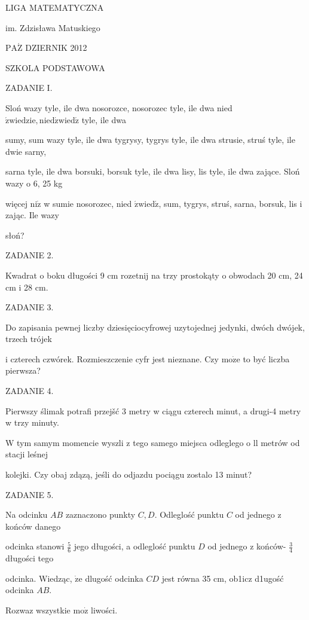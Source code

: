 \documentclass[a4paper,12pt]{article}
\begin{document}
LIGA MATEMATYCZNA

im. Zdzisława Matuskiego

$\mathrm{P}\mathrm{A}\acute{\mathrm{Z}}$ DZIERNIK 2012

SZKOLA PODSTAWOWA

ZADANIE I.

Sloń wazy tyle, ile dwa nosorozce, nosorozec tyle, ile dwa nied $\acute{\mathrm{z}}\mathrm{w}\mathrm{i}\mathrm{e}\mathrm{d}\mathrm{z}\mathrm{i}\mathrm{e}, \mathrm{n}\mathrm{i}\mathrm{e}\mathrm{d}\acute{\mathrm{z}}\mathrm{w}\mathrm{i}\mathrm{e}\mathrm{d}\acute{\mathrm{z}}$ tyle, ile dwa

sumy, sum wazy tyle, ile dwa tygrysy, tygrys tyle, ile dwa strusie, struś tyle, ile dwie sarny,

sarna tyle, ile dwa borsuki, borsuk tyle, ile dwa lisy, lis tyle, ile dwa zające. Sloń wazy o 6, 25 kg

więcej $\mathrm{n}\mathrm{i}\dot{\mathrm{z}}$ w sumie nosorozec, nied $\acute{\mathrm{z}}\mathrm{w}\mathrm{i}\mathrm{e}\mathrm{d}\acute{\mathrm{z}}$, sum, tygrys, struś, sarna, borsuk, lis i zając. Ile wazy

słoń?

ZADANIE 2.

Kwadrat o boku długości 9 cm rozetnij na trzy prostokąty o obwodach 20 cm, 24 cm i 28 cm.

ZADANIE 3.

Do zapisania pewnej liczby dziesięciocyfrowej uzytojednej jedynki, dwóch dwójek, trzech trójek

i czterech czwórek. Rozmieszczenie cyfr jest nieznane. Czy $\mathrm{m}\mathrm{o}\dot{\mathrm{z}}\mathrm{e}$ to być liczba pierwsza?

ZADANIE 4.

Pierwszy ślimak potrafi przejšć 3 metry w ciągu czterech minut, a drugi-4 metry w trzy minuty.

W tym samym momencie wyszli z tego samego miejsca odleglego o ll metrów od stacji leśnej

kolejki. Czy obaj zdązą, jeśli do odjazdu pociągu zostalo 13 minut?

ZADANIE 5.

Na odcinku $AB$ zaznaczono punkty $C, D$. Odleglość punktu $C$ od jednego z końców danego

odcinka stanowi $\displaystyle \frac{5}{6}$ jego długości, a odleglość punktu $D$ od jednego z końców- $\displaystyle \frac{3}{4}$ długości tego

odcinka. Wiedząc, $\dot{\mathrm{z}}\mathrm{e}$ dlugość odcinka $CD$ jest równa 35 cm, ob1icz d1ugość odcinka $AB.$

Rozwaz wszystkie $\mathrm{m}\mathrm{o}\dot{\mathrm{z}}$ liwości.
\end{document}
